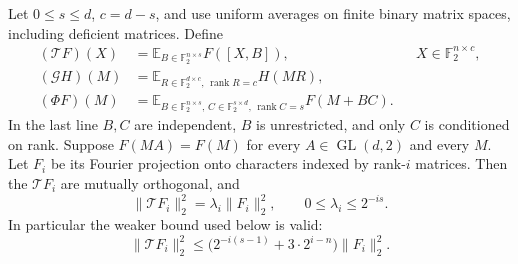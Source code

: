 \begin{lemma}\label{lem:finite-spectral}
Let $0\le s\le d$, $c=d-s$, and use uniform averages on finite binary
matrix spaces, including deficient matrices. Define
\[
 \begin{aligned}
 (\mathcal TF)(X)&=\mathbb E_{B\in\mathbb F_2^{n\times s}}F([X,B]),
       &&X\in\mathbb F_2^{n\times c},\\
 (\mathcal GH)(M)&=\mathbb E_{R\in\mathbb F_2^{d\times c},\,
                         \operatorname{rank}R=c}H(MR),\\
 (\Phi F)(M)&=\mathbb E_{B\in\mathbb F_2^{n\times s},\,
                    C\in\mathbb F_2^{s\times d},\,
                    \operatorname{rank}C=s}F(M+BC).
 \end{aligned}
\]
In the last line $B,C$ are independent, $B$ is unrestricted, and only
$C$ is conditioned on rank. Suppose $F(MA)=F(M)$ for every
$A\in\operatorname{GL}(d,2)$ and every $M$. Let $F_i$ be its Fourier
projection onto characters indexed by rank-$i$ matrices. Then the
$\mathcal TF_i$ are mutually orthogonal, and
\[
 \|\mathcal TF_i\|_2^2=\lambda_i\|F_i\|_2^2,
 \qquad 0\le\lambda_i\le2^{-is}.
\]
In particular the weaker bound used below is valid:
\[
 \|\mathcal TF_i\|_2^2
 \le\bigl(2^{-i(s-1)}+3\cdot2^{i-n}\bigr)\|F_i\|_2^2.
\]
\end{lemma}
